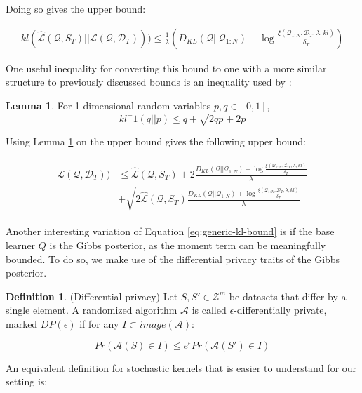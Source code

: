 \documentclass{article}
\theoremstyle{definition}
\newtheorem{defn}{Definition}[section]
\newtheorem{lemma}{Lemma}[section]
\begin{document}
Doing so gives the upper bound:

\begin{align} \label{eq:generic-kl-bound}
kl(\hat{\mathcal{L}}(\mathcal{Q}, S_T)||\mathcal{L}(\mathcal{Q},\mathcal{D}_T))) \leq \frac{1}{\lambda}\left (D_{KL}(\mathcal{Q}||\mathcal{Q}_{1:N})+\log\frac{\bar{\xi}(\mathcal{Q}_{1:N}, \mathcal{D}_T,\lambda, kl)}{\delta_T} \right )
\end{align}

One useful inequality for converting this bound to one with a more similar structure to previously discussed bounds is an inequality used by \citet{Tolstikhin2013}:

\begin{lemma} \citep{Tolstikhin2013} \label{thm:kl-inverse}
	For 1-dimensional random variables $p,q \in [0, 1]$,
	$$kl^-1(q||p)\leq q + \sqrt{2qp}+2p$$
\end{lemma}

Using Lemma \ref{thm:kl-inverse} on the upper bound gives the following upper bound:

\begin{align} \label{eq:tolstikhin-kl-bound}
\begin{split}
\mathcal{L}(\mathcal{Q},\mathcal{D}_T)) &\leq \hat{\mathcal{L}}(\mathcal{Q}, S_T) + 2\frac{D_{KL}(\mathcal{Q}||\mathcal{Q}_{1:N})+\log\frac{\xi(\mathcal{Q}_{1:N}, \mathcal{D}_T,\lambda, kl)}{\delta_T}}{\lambda}\\
&+\sqrt{2\hat{\mathcal{L}}(\mathcal{Q}, S_T)\frac{D_{KL}(\mathcal{Q}||\mathcal{Q}_{1:N})+\log\frac{\xi(\mathcal{Q}_{1:N}, \mathcal{D}_T,\lambda, kl)}{\delta_T}}{\lambda}}
\end{split}
\end{align}

Another interesting variation of Equation \ref{eq:generic-kl-bound} is if the base learner $Q$ is the Gibbs posterior, as the moment term can be meaningfully bounded. To do so, we make use of the differential privacy traits of the Gibbs posterior.

\begin{defn} (Differential privacy)
	Let $S,S'\in \mathcal{Z}^m$ be datasets that differ by a single element.
	A randomized algorithm $\mathcal{A}$ is called  $\epsilon$-differentially private, marked $DP(\epsilon)$ if for any $I\subset image(\mathcal{A})$:
	
	$$Pr(\mathcal{A}(S)\in I)\leq e^\epsilon Pr(\mathcal{A}(S')\in I)$$
\end{defn}

An equivalent definition for stochastic kernels that is easier to understand for our setting is:
\end{document}
